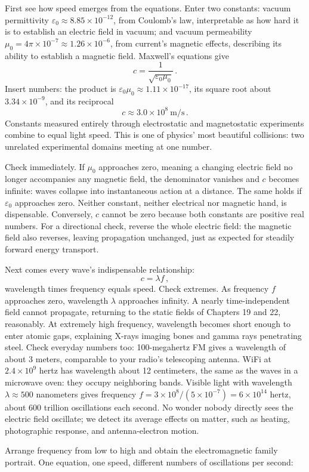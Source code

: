 \begin{mainline}
First see how speed emerges from the equations. Enter two constants: vacuum permittivity $\varepsilon_0\approx 8.85\times 10^{-12}$, from Coulomb's law, interpretable as how hard it is to establish an electric field in vacuum; and vacuum permeability $\mu_0 = 4\pi\times 10^{-7}\approx 1.26\times 10^{-6}$, from current's magnetic effects, describing its ability to establish a magnetic field. Maxwell's equations give
\[
  c=\frac{1}{\sqrt{\varepsilon_0\mu_0}}\,.
\]
Insert numbers: the product is $\varepsilon_0\mu_0\approx 1.11\times 10^{-17}$, its square root about $3.34\times 10^{-9}$, and its reciprocal
\[
  c\approx 3.0\times 10^{8}\ \text{m/s}\,.
\]
Constants measured entirely through electrostatic and magnetostatic experiments combine to equal light speed. This is one of physics' most beautiful collisions: two unrelated experimental domains meeting at one number.

Check immediately. If $\mu_0$ approaches zero, meaning a changing electric field no longer accompanies any magnetic field, the denominator vanishes and $c$ becomes infinite: waves collapse into instantaneous action at a distance. The same holds if $\varepsilon_0$ approaches zero. Neither constant, neither electrical nor magnetic hand, is dispensable. Conversely, $c$ cannot be zero because both constants are positive real numbers. For a directional check, reverse the whole electric field: the magnetic field also reverses, leaving propagation unchanged, just as expected for steadily forward energy transport.

Next comes every wave's indispensable relationship:
\[
  c=\lambda f\,,
\]
wavelength times frequency equals speed. Check extremes. As frequency $f$ approaches zero, wavelength $\lambda$ approaches infinity. A nearly time-independent field cannot propagate, returning to the static fields of Chapters 19 and 22, reasonably. At extremely high frequency, wavelength becomes short enough to enter atomic gaps, explaining X-rays imaging bones and gamma rays penetrating steel. Check everyday numbers too: 100-megahertz FM gives a wavelength of about 3 meters, comparable to your radio's telescoping antenna. WiFi at $2.4\times10^{9}$ hertz has wavelength about 12 centimeters, the same as the waves in a microwave oven: they occupy neighboring bands. Visible light with wavelength $\lambda\approx 500$ nanometers gives frequency $f = 3\times10^{8}/(5\times10^{-7}) = 6\times10^{14}$ hertz, about 600 trillion oscillations each second. No wonder nobody directly sees the electric field oscillate; we detect its average effects on matter, such as heating, photographic response, and antenna-electron motion.

Arrange frequency from low to high and obtain the electromagnetic family portrait. One equation, one speed, different numbers of oscillations per second:
\end{mainline}


